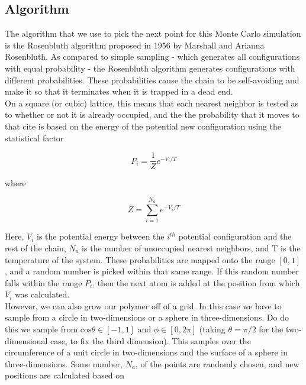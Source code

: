 \documentclass{article}
\begin{document}
\begin{multicols}{2}
\subsection{Algorithm}
\label{RA}

The algorithm that we use to pick the next point for this Monte Carlo simulation is the Rosenbluth algorithm proposed in 1956 by Marshall and Arianna Rosenbluth.  As compared to simple sampling - which generates all configurations with equal probability - the Rosenbluth algorithm generates configurations with different probabilities.  These probabilities cause the chain to be self-avoiding and make it so that it terminates when it is trapped in a dead end.  \cite{Rosenbluth} \\

On a square (or cubic) lattice, this means that each nearest neighbor is tested as to whether or not it is already occupied, and the the probability that it moves to that cite is based on the energy of the potential new configuration using the statistical factor

\begin{equation}
\label{prob}
P_i = \frac{1}{Z} e^{-V_i/T}
\end{equation}

\noindent where

\begin{equation}
\label{part}
Z = \sum \limits _{i=1}^{N_a} e^{-V_i/T}
\end{equation}

\noindent Here, $V_i$ is the potential energy between the $i^{th}$ potential configuration and the rest of the chain, $N_a$ is the number of unoccupied nearest neighbors, and T is the temperature of the system.  These probabilities are mapped onto the range $[0,1]$, and a random number is picked within that same range.  If this random number falls within the range $P_i$, then the next atom is added at the position from which $V_i$ was calculated.  \\

However, we can also grow our polymer off of a grid.  In this case we have to sample from a circle in two-dimensions or a sphere in three-dimensions.  Do do this we sample from $\mathrm{cos}\theta \in [-1,1]$ and $\phi \in [0,2\pi]$ (taking $\theta = \pi/2$ for the two-dimensional case, to fix the third dimension).  This samples over the circumference of a unit circle in two-dimensions and the surface of a sphere in three-dimensions.  Some number, $N_a$, of the points are randomly chosen, and new positions are calculated based on 


\end{multicols}
\end{document}
